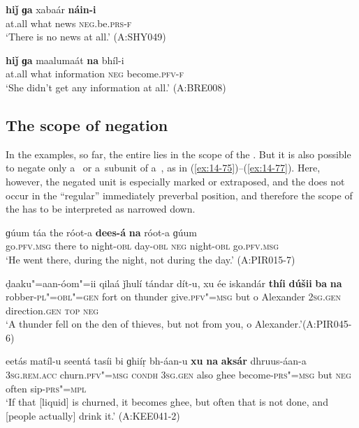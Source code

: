 \begin{exe}
\ex
\label{ex:14-73}
\gll \textbf{hiǰ} \textbf{ɡa} xabaár \textbf{náin-i} \\
at.all what news \textsc{neg}.be.\textsc{prs-f}  \\
\glt `There is no news at all.' (A:SHY049)

\ex
\label{ex:14-74}
\gll \textbf{hiǰ} \textbf{ɡa} maalumaát \textbf{na} bhíl-i \\
at.all what information \textsc{neg} become.\textsc{pfv-f } \\
\glt `She didn't get any information at all.' (A:BRE008)
\end{exe}

\subsection{The scope of negation}
\label{subsec:14-3-3}


 In the examples, so far, the entire  lies in the scope of the . But it is also possible to negate only a~ or a~subunit of a~, as in (\ref{ex:14-75})--(\ref{ex:14-77}). Here, however, the negated unit is especially marked or extraposed, and the  does not occur in the ``regular'' immediately preverbal position, and therefore the scope of the  has to be interpreted as narrowed down. 

\begin{exe}
\ex
\label{ex:14-75}
\gll ɡúum táa the róot-a \textbf{dees-á} \textbf{na} róot-a  ɡúum \\
go.\textsc{pfv.msg} there to night-\textsc{obl} day-\textsc{obl} \textsc{neg} night-\textsc{obl}  go.\textsc{pfv.msg}  \\
\glt `He went there, during the night, not during the day.' (A:PIR015-7)

\ex
\label{ex:14-76}
\gll ḍaaku"=aan-óom"=ii qilaá ǰhulí tándar dít-u, xu ée iskandár \textbf{thíi} \textbf{dúšii} \textbf{ba} \textbf{na} \\
robber-\textsc{pl"=obl"=gen} fort on thunder give.\textsc{pfv"=msg} but o Alexander \textsc{2sg.gen} direction.\textsc{gen} \textsc{top} \textsc{neg} \\
\glt `A thunder fell on the den of thieves, but not from you, o Alexander.'\newline (A:PIR045-6)

\ex
\label{ex:14-77}
\gll eetás matíl-u seentá tasíi bi ɡhiíṛ  bh-áan-u \textbf{xu} \textbf{na} \textbf{aksár} dhruus-áan-a\\
\textsc{3sg.rem.acc} churn.\textsc{pfv"=msg} \textsc{condh} \textsc{3sg.gen} also ghee  become-\textsc{prs"=msg} but \textsc{neg} often sip-\textsc{prs"=mpl}  \\
\glt `If that [liquid] is churned, it becomes ghee, but often that is not done, and [people actually] drink it.' (A:KEE041-2)
\end{exe}

